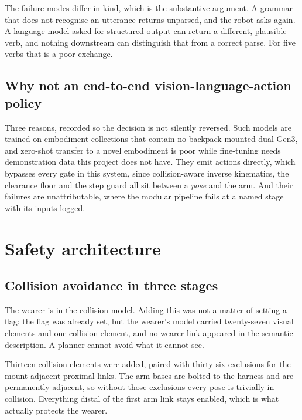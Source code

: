 The failure modes differ in kind, which is the substantive argument. A grammar
that does not recognise an utterance returns unparsed, and the robot asks
again. A language model asked for structured output can return a different,
plausible verb, and nothing downstream can distinguish that from a correct
parse. For five verbs that is a poor exchange.

\subsection{Why not an end-to-end vision-language-action policy}

Three reasons, recorded so the decision is not silently reversed. Such models
are trained on embodiment collections that contain no backpack-mounted dual
Gen3, and zero-shot transfer to a novel embodiment is poor while fine-tuning
needs demonstration data this project does not have. They emit actions
directly, which bypasses every gate in this system, since collision-aware
inverse kinematics, the clearance floor and the step guard all sit between a
\emph{pose} and the arm. And their failures are unattributable, where the
modular pipeline fails at a named stage with its inputs logged.

\section{Safety architecture}

\subsection{Collision avoidance in three stages}
\label{sec:clearance}

The wearer is in the collision model. Adding this was not a matter of setting
a flag: the flag was already set, but the wearer's model carried
twenty-seven visual elements and one collision element, and no wearer link
appeared in the semantic description. A planner cannot avoid what it cannot
see.

Thirteen collision elements were added, paired with thirty-six exclusions for
the mount-adjacent proximal links. The arm bases are bolted to the harness and
are permanently adjacent, so without those exclusions every pose is trivially
in collision. Everything distal of the first arm link stays enabled, which is
what actually protects the wearer.

